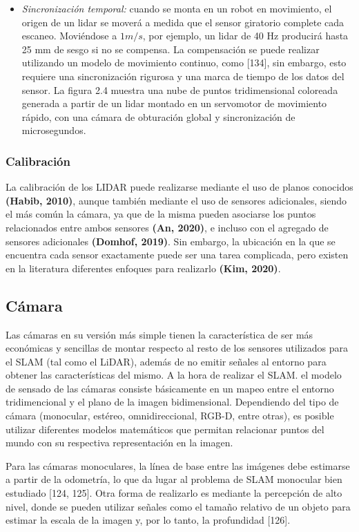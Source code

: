 \begin{itemize}
    \item \textit{Sincronización temporal:} cuando se monta en un robot en movimiento, el origen de un lidar se moverá a medida que el sensor giratorio complete cada escaneo. Moviéndose a $1m/s$, por ejemplo, un lidar de 40 Hz producirá hasta 25 mm de sesgo si no se compensa. La compensación se puede realizar utilizando un modelo de movimiento continuo, como [134], sin embargo, esto requiere una sincronización rigurosa y una marca de tiempo de los datos del sensor. La figura 2.4 muestra una nube de puntos tridimensional coloreada generada a partir de un lidar montado en un servomotor de movimiento rápido, con una cámara de obturación global y sincronización de microsegundos.
\end{itemize}

\subsubsection{Calibración}
La calibración de los LIDAR puede realizarse mediante el uso de planos conocidos \textbf{(Habib, 2010)}, aunque también mediante el uso de sensores adicionales, siendo el más común la cámara, ya que de la misma pueden asociarse los puntos relacionados entre ambos sensores \textbf{(An, 2020)}, e incluso con el agregado de sensores adicionales \textbf{(Domhof, 2019)}. Sin embargo, la ubicación en la que se encuentra cada sensor exactamente puede ser una tarea complicada, pero existen en la literatura diferentes enfoques para realizarlo \textbf{(Kim, 2020)}.

\subsection{Cámara}
Las cámaras en su versión más simple tienen la característica de ser más económicas y sencillas de montar respecto al resto de los sensores utilizados para el SLAM (tal como el LiDAR), además de no emitir señales al entorno para obtener las características del mismo. A la hora de realizar el SLAM. el modelo de sensado de las cámaras consiste básicamente en un mapeo entre el entorno tridimencional y el plano de la imagen bidimensional. Dependiendo del tipo de cámara (monocular, estéreo, omnidireccional, RGB-D, entre otras), es posible utilizar diferentes modelos matemáticos que permitan relacionar puntos del mundo con su respectiva representación en la imagen.

Para las cámaras monoculares, la línea de base entre las imágenes debe estimarse a partir de la odometría, lo que da lugar al problema de SLAM monocular bien estudiado [124, 125]. Otra forma de realizarlo es mediante la percepción de alto nivel, donde se pueden utilizar señales como el tamaño relativo de un objeto para estimar la escala de la imagen y, por lo tanto, la profundidad [126].

